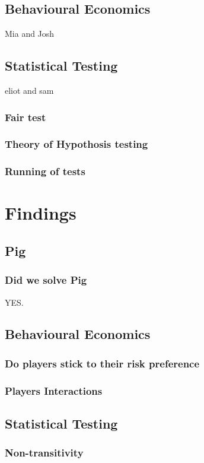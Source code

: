 \documentclass[a4paper,titlepage]{article}
\begin{document}
\subsection{Behavioural Economics}
Mia and Josh

\subsection{Statistical Testing}
eliot and sam
\subsubsection{Fair test}
\subsubsection{Theory of Hypothosis testing}
\subsubsection{Running of tests}


\section{Findings}
\subsection{Pig}
\subsubsection{Did we solve Pig}
{\tiny YES.}

\subsection{Behavioural Economics}
\subsubsection{Do players stick to their risk preference}
\subsubsection{Players Interactions}

\subsection{Statistical Testing}
\subsubsection{Non-transitivity}
\end{document}
